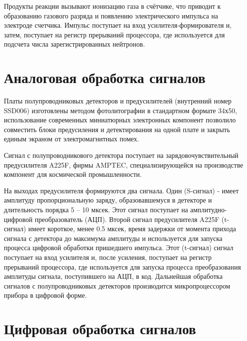 Продукты реакции вызывают ионизацию газа в счётчике, что приводит к образованию газового разряда и появлению электрического импульса на электроде счетчика. Импульс поступает на вход усилителя-формирователя и, затем, поступает на регистр прерываний процессора, где используется для подсчета числа зарегистрированных нейтронов.

\section{Аналоговая обработка сигналов}

Платы полупроводниковых детекторов и предусилителей (внутренний номер SSD006) изготовлены методом фотолитографии в стандартном формате 34х50, использование современных миниатюрных электронных компонент позволило совместить блоки предусиления и детектирования на одной плате и закрыть единым экраном от электромагнитных помех.

Сигнал с полупроводникового детектора поступает на зарядовочувствительный предусилителя A225F, фирмы AMPTEC, специализирующейся на производстве компонент для космической промышленности. 


На выходах предусилителя формируются два сигнала. Один (S-сигнал) - имеет амплитуду пропорциональную заряду, образовавшемуся в детекторе и длительность порядка 5 -- 10 мксек. Этот сигнал поступает на амплитудно-цифровой преобразователь (АЦП). Второй сигнал предусилителя A225F (t-сигнал) имеет короткое, менее 0.5 мксек, время задержки от момента прихода сигнала с детектора до максимума амплитуды и используется для запуска процесса цифровой обработки пришедшего импульса. Этот (t-сигнал) сигнал поступает на вход усилителя и, после усиления, поступает на регистр прерываний процессора, где используется для запуска процесса преобразования амплитуды сигнала, поступившего на АЦП, в код. Дальнейшая обработка сигналов с полупроводниковых детекторов производится микропроцессором прибора в цифровой форме.

\section{Цифровая обработка сигналов}

